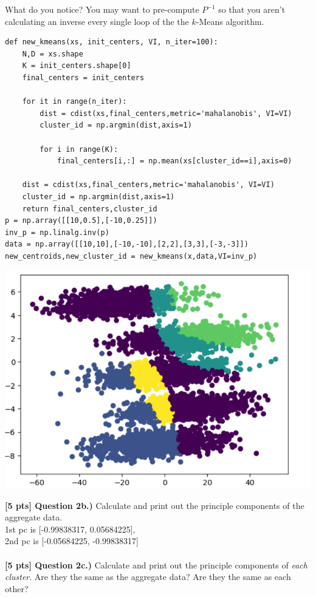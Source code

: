 \documentclass[paper=a4, fontsize=11pt]{scrartcl} %
\begin{document}
What do you notice? You may want to pre-compute $P^{-1}$ so that you aren't calculating an inverse every single loop of the the $k$-Means algorithm. 
\begin{verbatim}
def new_kmeans(xs, init_centers, VI, n_iter=100):
    N,D = xs.shape
    K = init_centers.shape[0]
    final_centers = init_centers
    
    for it in range(n_iter):
        dist = cdist(xs,final_centers,metric='mahalanobis', VI=VI)
        cluster_id = np.argmin(dist,axis=1)
            
        for i in range(K):
            final_centers[i,:] = np.mean(xs[cluster_id==i],axis=0)    
            
    dist = cdist(xs,final_centers,metric='mahalanobis', VI=VI)
    cluster_id = np.argmin(dist,axis=1)
    return final_centers,cluster_id
p = np.array([[10,0.5],[-10,0.25]])
inv_p = np.linalg.inv(p)
data = np.array([[10,10],[-10,-10],[2,2],[3,3],[-3,-3]])
new_centroids,new_cluster_id = new_kmeans(x,data,VI=inv_p)
\end{verbatim}
\includegraphics{include/new_kmeans_cluster.png}

\textbf{[5 pts] Question 2b.)}
Calculate and print out the principle components of the aggregate data. \\

1st pc is [-0.99838317,  0.05684225], \\
2nd pc is [-0.05684225, -0.99838317]
\\ \\
\textbf{[5 pts] Question 2c.)}
Calculate and print out the principle components of \emph{each cluster}. Are they the same as the aggregate data? Are they the same as each other?\\
\end{document}

